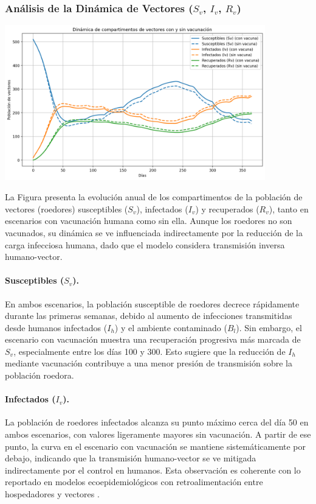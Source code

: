 \documentclass[12pt,a4paper]{article}
\begin{document}
\subsubsection[Análisis de la Dinámica de Vectores (Sv, Iv, Rv)]{Análisis de la Dinámica de Vectores (\texorpdfstring{$S_v$, $I_v$, $R_v$}{Sv, Iv, Rv})}

\includegraphics[width=0.85\textwidth]{Images/vectores.png}

La Figura presenta la evolución anual de los compartimentos de la población de vectores (roedores) susceptibles ($S_v$), infectados ($I_v$) y recuperados ($R_v$), tanto en escenarios con vacunación humana como sin ella. Aunque los roedores no son vacunados, su dinámica se ve influenciada indirectamente por la reducción de la carga infecciosa humana, dado que el modelo considera transmisión inversa humano-vector.

\paragraph{Susceptibles ($S_v$).} En ambos escenarios, la población susceptible de roedores decrece rápidamente durante las primeras semanas, debido al aumento de infecciones transmitidas desde humanos infectados ($I_h$) y el ambiente contaminado ($B_l$). Sin embargo, el escenario con vacunación muestra una recuperación progresiva más marcada de $S_v$, especialmente entre los días 100 y 300. Esto sugiere que la reducción de $I_h$ mediante vacunación contribuye a una menor presión de transmisión sobre la población roedora.

\paragraph{Infectados ($I_v$).} La población de roedores infectados alcanza su punto máximo cerca del día 50 en ambos escenarios, con valores ligeramente mayores sin vacunación. A partir de ese punto, la curva en el escenario con vacunación se mantiene sistemáticamente por debajo, indicando que la transmisión humano-vector se ve mitigada indirectamente por el control en humanos. Esta observación es coherente con lo reportado en modelos ecoepidemiológicos con retroalimentación entre hospedadores y vectores \cite{kassa2021}.
\end{document}
